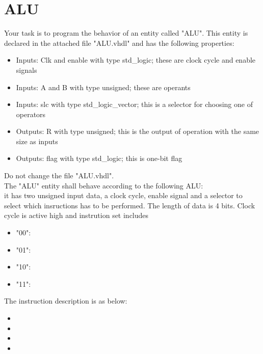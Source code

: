 \documentclass[a4paper,12pt]{article}
\begin{document}
\pagestyle{empty}
\setlength{\parindent}{0em} 
\section*{ALU}

Your task is to program the behavior of an entity called "ALU". This entity is declared in the attached file "ALU.vhdl" and has the following properties:
\begin{itemize}
\item Inputs: Clk and enable with type std\_logic; these are clock cycle and enable signals
\item Inputs: A and B with type unsigned; these are operants
\item Inputs: slc with type std\_logic\_vector; this is a selector for choosing one of operators
\item Outputs: R with type unsigned; this is the output of operation with the same size as inputs
\item Outputs: flag with type std\_logic; this is one-bit flag
\end{itemize}
\vspace{0.3cm}

Do not change the file "ALU.vhdl".
\\

The "ALU" entity shall behave according to the following ALU:
\\
it has two unsigned input data, a clock cycle, enable signal and a selector to select which insructions has to be performed. The length of data is 4 bits. Clock cycle is active high and instrution set includes %
\\
\begin{itemize}
\item "00": %
\item "01": %
\item "10": %
\item "11": %
\end{itemize}
\vspace{0.3cm}

The instruction description is as below:
\begin{itemize}
\item %
\item %
\item %
\item %
\end{itemize}
\vspace{0.3cm}
\end{document}
